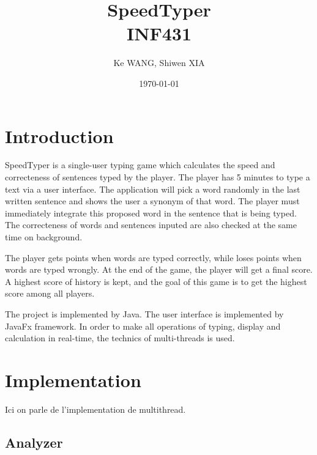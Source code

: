 \documentclass{article}
\title{SpeedTyper \\ INF431} %
\author{Ke \textsc{WANG}, Shiwen \textsc{XIA}} %
\date{\today} %
\begin{document}
\maketitle %




\section{Introduction}

SpeedTyper is a single-user typing game which calculates the speed and correcteness of sentences typed by the player. The player has 5 minutes to type a text via a user interface. The application will pick a word randomly in the last written sentence and shows the user a synonym of that word. The player must immediately integrate this proposed word in the sentence that is being typed. The correcteness of words and sentences inputed are also checked at the same time on background.

The player gets points when words are typed correctly, while loses points when words are typed wrongly. At the end of the game, the player will get a final score. A highest score of history is kept, and the goal of this game is to get the highest score among all players.

The project is implemented by Java. The user interface is implemented by JavaFx framework. In order to make all operations of typing, display and calculation in real-time, the technics of  multi-threads is used.


 

\section{Implementation}

Ici on parle de l'implementation de multithread.
\subsection{Analyzer}
\end{document}
